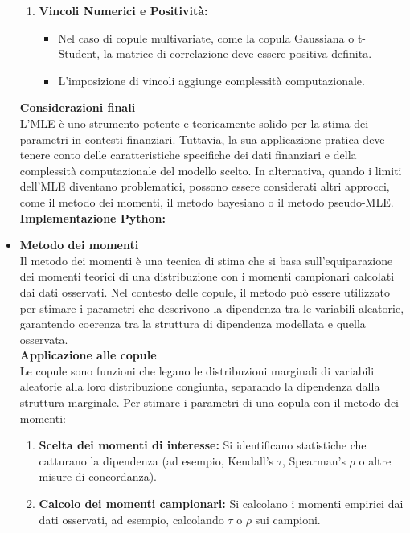 \documentclass[a4paper,12pt]{article}
\begin{document}
\begin{itemize}
\begin{enumerate}[label=\arabic*.]
		\item \textbf{Vincoli Numerici e Positività:}
		\begin{itemize}
			\item Nel caso di copule multivariate, come la copula Gaussiana o t-Student, la matrice di correlazione deve essere positiva definita. 
			\item L'imposizione di vincoli aggiunge complessità computazionale.
		\end{itemize}
	\end{enumerate}
	\textbf{Considerazioni finali}\\
	L'MLE è uno strumento potente e teoricamente solido per la stima dei parametri in contesti finanziari. Tuttavia, la sua applicazione pratica deve tenere conto delle caratteristiche specifiche dei dati finanziari e della complessità computazionale del modello scelto. In alternativa, quando i limiti dell'MLE diventano problematici, possono essere considerati altri approcci, come il metodo dei momenti, il metodo bayesiano o il metodo pseudo-MLE.\\
	
	\textbf{Implementazione Python:}
	\item \textbf{Metodo dei momenti}\\
	Il metodo dei momenti è una tecnica di stima che si basa sull'equiparazione dei momenti teorici di una distribuzione con i momenti campionari calcolati dai dati osservati. Nel contesto delle copule, il metodo può essere utilizzato per stimare i parametri che descrivono la dipendenza tra le variabili aleatorie, garantendo coerenza tra la struttura di dipendenza modellata e quella osservata.\\
	
	\textbf{Applicazione alle copule}\\
	Le copule sono funzioni che legano le distribuzioni marginali di variabili aleatorie alla loro distribuzione congiunta, separando la dipendenza dalla struttura marginale. Per stimare i parametri di una copula con il metodo dei momenti:
	
	\begin{enumerate}[label=\arabic*.]
		\item \textbf{Scelta dei momenti di interesse:} Si identificano statistiche che catturano la dipendenza (ad esempio, Kendall's \(\tau\), Spearman's \(\rho\) o altre misure di concordanza).
		
		\item \textbf{Calcolo dei momenti campionari:} Si calcolano i momenti empirici dai dati osservati, ad esempio, calcolando \(\tau\) o \(\rho\) sui campioni.
		

\end{enumerate}
\end{itemize}
\end{document}
